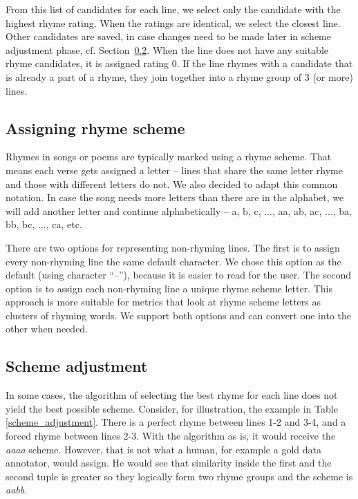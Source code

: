 From this list of candidates for each line, we select only the candidate with the highest rhyme rating. When the ratings are identical, we select the closest line. Other candidates are saved, in case changes need to be made later in scheme adjustment phase, cf. Section~\ref{sec:scheme-adjustment}. When the line does not have any suitable rhyme candidates, it is assigned rating 0. If the line rhymes with a candidate that is already a part of a rhyme, they join together into a rhyme group of 3 (or more) lines.
 



\subsection{Assigning rhyme scheme}\label{sec:scheme}
 Rhymes in songs or poems are typically marked using a rhyme scheme. That means each verse gets assigned a letter -- lines that share the same letter rhyme and those with different letters do not. We also decided to adapt this common notation. In case the song needs more letters than there are in the alphabet, we will add another letter and continue alphabetically -- a, b, c, ..., aa, ab, ac, ..., ba, bb, bc, ..., ca, etc.
 
 There are two options for representing non-rhyming lines. The first is to assign every non-rhyming line the same default character. We chose this option as the default (using character ``--''), because it is easier to read for the user. The second option is to assign each non-rhyming line a unique rhyme scheme letter. This approach is more suitable for metrics that look at rhyme scheme letters as clusters of rhyming words. We support both options and can convert one into the other when needed.

\subsection{Scheme adjustment}\label{sec:scheme-adjustment}
In some cases, the algorithm of selecting the best rhyme for each line does not yield the best possible scheme. Consider, for illustration, the example in Table \ref{scheme_adjustment}. There is a perfect rhyme between lines 1-2 and 3-4, and a forced rhyme between lines 2-3. With the algorithm as is, it would receive the \textit{aaaa} scheme. However, that is not what a human, for example a gold data annotator, would assign. He would see that similarity inside the first and the second tuple is greater so they logically form two rhyme groups and the scheme is \textit{aabb}. 

